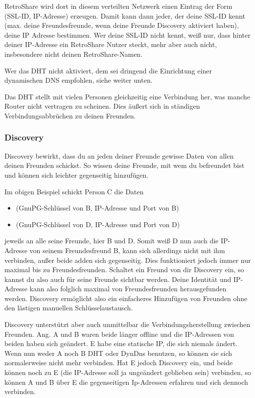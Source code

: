 RetroShare wird dort in diesem verteilten Netzwerk einen Eintrag der Form (SSL-ID, IP-Adresse)  erzeugen. Damit kann dann jeder, der deine SSL-ID kennt (max. deine Freundesfreunde, wenn deine Freunde Discovery aktiviert haben), deine IP Adresse bestimmen.
Wer deine SSL-ID nicht kennt, weiß nur, dass hinter deiner IP-Adresse ein RetroShare Nutzer steckt, mehr aber auch nicht, insbesondere nicht deinen RetroShare-Namen.

Wer das DHT nicht aktiviert, dem sei dringend die Einrichtung einer dynamischen DNS empfohlen, siehe weiter unten.

Das DHT stellt mit vielen Personen gleichzeitig eine Verbindung her, was manche Router nicht vertragen zu scheinen. Dies äußert sich in ständigen Verbindungsabbrüchen zu deinen Freunden.

\subsubsection{Discovery}
Discovery bewirkt, dass du an jeden deiner Freunde gewisse Daten von allen deinen Freunden schickst. So wissen deine Freunde, mit wem du befreundet bist und können sich leichter gegenseitig hinzufügen.

Im obigen Beispiel schickt Person C die Daten
\begin{itemize}
 \item (GnuPG-Schlüssel von B, IP-Adresse und Port von B)
 \item (GnuPG-Schlüssel von D, IP-Adresse und Port von D)
\end{itemize}
jeweils an alle seine Freunde, hier B und D. Somit weiß D nun auch die IP-Adresse von seinem Freundesfreund B, kann sich allerdings nicht mit ihm verbinden, außer beide adden sich gegenseitig. Dies funktioniert jedoch immer nur maximal bis zu Freundesfreunden. Schaltet ein Freund von dir Discovery ein, so kannst du also auch für seine Freunde sichtbar werden. Deine Identität und IP-Adresse kann also folglich maximal von Freundesfreunden herausgefunden werden.
Discovery ermöglicht also ein einfacheres Hinzufügen von Freunden ohne den lästigen manuellen Schlüsselaustausch.

Discovery unterstützt aber auch unmittelbar die Verbindungsherstellung zwischen Freunden. Ang. A und B waren beide länger offline und die IP-Adressen von beiden haben sich geändert. E habe eine statische IP, die sich niemals ändert. Wenn nun weder A noch B DHT oder DynDns benutzen, so können sie sich normalerweise nicht mehr verbinden.
Hat E jedoch Discovery ein, und beide können noch zu E (die IP-Adresse soll ja ungeändert geblieben sein) verbinden, so können A und B über E die gegenseitigen Ip-Adressen erfahren und sich dennoch verbinden.


